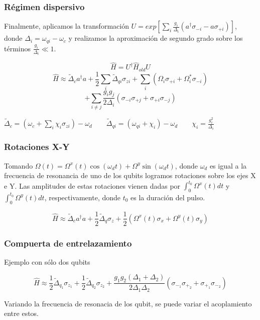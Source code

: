 \documentclass[xetex,mathserif,serif]{beamer}
\begin{document}
\begin{frame}
    \frametitle{Régimen dispersivo}

\justify
Finalmente, aplicamos la transformación $U = exp[\sum\limits_i \frac{g_i}
{\Delta_i} (a^\dagger \sigma_{-i} - a \sigma_{+i})]$, donde $\Delta_i = 
\omega_{qi} - \omega_c$ y realizamos la aproximación de segundo grado sobre
los términos $\frac{g_i}{\Delta_i} \ll 1$.

$$\hat{H} = U^\dagger \hat{H}_{old} U$$
$$\hat{H} \approx \tilde{\Delta}_c a^\dagger a + \frac{1}{2} \sum\limits_i
  \tilde{\Delta}_{qi} \sigma_{zi} + \sum\limits_i (\Omega_i \sigma_{+i} +
  \Omega_i^* \sigma_{-i})$$
$$+ \sum\limits_{i \neq j} \frac{g_i g_j}{2 \Delta_i} 
  (\sigma_{-i} \sigma_{+j}+\sigma_{+i} \sigma_{-j})$$

$\tilde{\Delta}_c = (\omega_c + \sum\limits_i \chi_i \sigma_{zi}) - \omega_d
 \qquad
 \tilde{\Delta}_{qi} = (\omega_{qi} + \chi_i) - \omega_d
 \qquad
 \chi_i = \frac{g_i^2}{\Delta_i}$

 \end{frame}
 
 \begin{frame}
     \frametitle{Rotaciones X-Y}

\justify
Tomando $\Omega(t) = \Omega^x(t) \cos(\omega_d t) + \Omega^y \sin(\omega_d t)$,
donde $\omega_d$ es igual a la frecuencia de resonancia de uno de los qubits
logramos rotaciones sobre los ejes X e Y. Las amplitudes de estas rotaciones
vienen dadas por $\int_0^{t_0} \Omega^x(t) dt$ y $\int_0^{t_0} \Omega^y(t)
dt$, respectivamente, donde $t_0$ es la duración del pulso.

$$\hat{H} \approx \tilde{\Delta}_c a^\dagger a + \frac{1}{2} \tilde{\Delta}_q 
  \sigma_z + \frac{1}{2} (\Omega^x(t) \sigma_x + \Omega^y(t) \sigma_y)$$

  \end{frame}
  
\begin{frame}
  \frametitle{Compuerta de entrelazamiento}

Ejemplo con sólo dos qubits

$$\hat{H} \approx \frac{1}{2} \tilde{\Delta}_{q_1} \sigma_{z_1} + 
  \frac{1}{2} \tilde{\Delta}_{q_2} \sigma_{z_2} + 
  \frac{g_1 g_2 (\Delta_1 + \Delta_2)}{2 \Delta_1 \Delta_2} 
  (\sigma_{-_1} \sigma_{+_2} + \sigma_{+_1} \sigma_{-_2})$$

Variando la frecuencia de resonacia de los qubit, se puede variar el 
acoplamiento entre estos. 

\end{frame}
\end{document}
